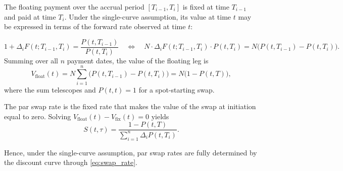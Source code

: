 The floating payment over the accrual period $[T_{i-1},T_i]$ is fixed at time $T_{i-1}$ and paid at time $T_i$. Under the single-curve assumption, its value at time $t$ may be expressed in terms of the forward rate observed at time $t$:


\[
1+\Delta_i F(t;T_{i-1},T_i)
=
\frac{P(t,T_{i-1})}{P(t,T_i)} \quad \Leftrightarrow \quad  N\cdot\Delta_i F(t;T_{i-1},T_i)\cdot P(t,T_i) = N\bigl(P(t,T_{i-1})-P(t,T_i)\bigr).
\]
Summing over all $n$ payment dates, the value of the floating leg is
\begin{equation}
V_{\mathrm{float}}(t) = N\sum_{i=1}^{n}\bigl(P(t,T_{i-1})-P(t,T_i)\bigr) = N\bigl(1-P(t,T)\bigr),
\label{eq:floating_leg}
\end{equation}
where the sum telescopes and $P(t,t)=1$ for a spot-starting swap.

The par swap rate is the fixed rate that makes the value of the swap at initiation equal to zero. Solving
\(
V_{\mathrm{float}}(t)-V_{\mathrm{fix}}(t)=0
\)
yields
\begin{equation}
S(t,\tau)
=
\frac{1-P(t,T)}
{\sum_{i=1}^{n} \Delta_i P(t,T_i)}.
\label{eq:swap_rate}
\end{equation}

Hence, under the single-curve assumption, par swap rates are fully determined by the discount curve through \eqref{eq:swap_rate}.





\newpage










